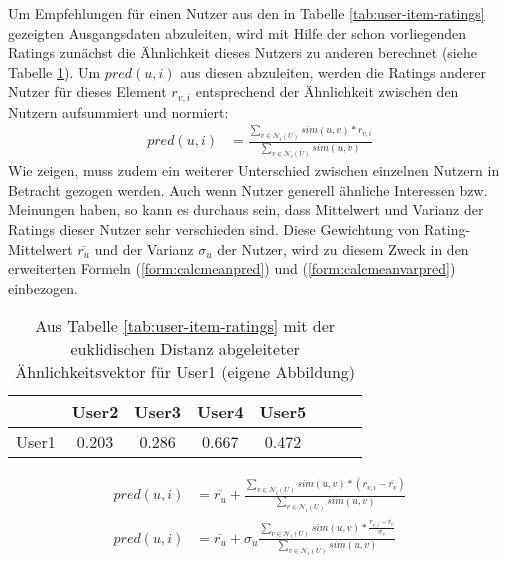 Um Empfehlungen für einen Nutzer aus den in Tabelle \ref{tab:user-item-ratings} gezeigten Ausgangsdaten abzuleiten, wird mit Hilfe der schon vorliegenden Ratings zunächst die Ähnlichkeit dieses Nutzers zu anderen berechnet (siehe Tabelle \ref{tab:user-user-sim}). Um $pred(u,i)$ aus diesen abzuleiten, werden die Ratings anderer Nutzer für dieses Element $r_{v,i}$ entsprechend der Ähnlichkeit zwischen den Nutzern aufsummiert und normiert:
\begin{align}
pred(u,i) & = \frac{ \sum_{v \in \mathcal{N}_i(U)} sim(u, v)*r_{v,i}}{ \sum_{v \in \mathcal{N}_i(U)} sim(u,v) } \label{form:calcpred}
\end{align}
Wie \citep{Herlocker:2002:EAD:593967.594047} zeigen, muss zudem ein weiterer Unterschied zwischen einzelnen Nutzern in Betracht gezogen werden. Auch wenn Nutzer generell ähnliche Interessen bzw. Meinungen haben, so kann es durchaus sein, dass Mittelwert und Varianz der Ratings dieser Nutzer sehr verschieden sind. Diese Gewichtung von Rating-Mittelwert $\overline{r_u}$ und der Varianz  $\sigma_u$ der Nutzer, wird zu diesem Zweck in den erweiterten Formeln (\ref{form:calcmeanpred}) und (\ref{form:calcmeanvarpred}) einbezogen. \citep{hb_04,Huete:2012:UPA:2206442.2206675}
\begin{table}[ht]
  \centering
\begin{minipage}[b]{4in}
  \begin{tabular}{ | l || c | c | c | c | c | c | c | }
    \hline
           & User2 & User3 & User4 & User5 \\ \hline
User1 &    0.203 &	0.286 &	0.667 & 0.472 \\
    \hline
  \end{tabular}
  \caption{\footnotesize Aus Tabelle \ref{tab:user-item-ratings} mit der euklidischen Distanz abgeleiteter Ähnlichkeitsvektor für User1 { \scriptsize (eigene Abbildung)}}
  \label{tab:user-user-sim}
\end{minipage}
\end{table}
\begin{align}
pred(u, i) & = \overline{r_u} + \frac{ \sum_{v \in \mathcal{N}_i(U)} sim(u, v)*(r_{v,i}-\overline{r_v}) } { \sum_{v \in \mathcal{N}_i(U)} sim(u,v) } \label{form:calcmeanpred} \\
pred(u, i) & = \overline{r_u} + \sigma_u \frac{ \sum_{v \in \mathcal{N}_i(U)} sim(u, v)*\frac{r_{v,i}-\overline{r_v}}{\sigma_v} } { \sum_{v \in \mathcal{N}_i(U)} sim(u,v) } \label{form:calcmeanvarpred}
\end{align}

